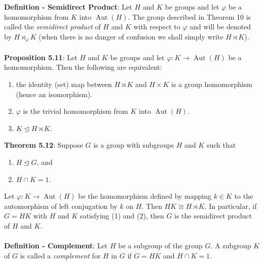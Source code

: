 \documentclass{article}
\DeclareMathOperator{\aut}{Aut}
\begin{document}
\textbf{Definition - Semidirect Product}: Let $H$ and $K$ be groups and let $\varphi$ be a homomorphism from $K$ into $\aut(H)$. The group described in Theorem 10 is called the \textit{semidirect product} of $H$ and $K$ with respect to $\varphi$ and will be denoted by $H \rtimes_\varphi K$ (when there is no danger of confusion we shall simply write $H \rtimes K$). \\ \\
\textbf{Proposition 5.11}: Let $H$ and $K$ be groups and let $\varphi: K \rightarrow \aut(H)$ be a homomorphism. Then the following are equivalent: \begin{enumerate}
    \item the identity (set) map between $H \rtimes K$ and $H \times K$ is a group homomorphism (hence an isomorphism).
    \item $\varphi$ is the trivial homomorphism from $K$ into $\aut(H)$.
    \item $K \trianglelefteq H \rtimes K$. 
\end{enumerate} $ $ \\
\textbf{Theorem 5.12}: Suppose $G$ is a group with subgroups $H$ and $K$ such that \begin{enumerate}
    \item $H \trianglelefteq G$, and
    \item $H \cap K = 1$. 
\end{enumerate} Let $\varphi: K \rightarrow \aut(H)$ be the homomorphism defined by mapping $k \in K$ to the automorphism of left conjugation by $k$ on $H$. Then $HK \cong H \rtimes K$. In particular, if $G = HK$ with $H$ and $K$ satisfying (1) and (2), then $G$ is the semidirect product of $H$ and $K$. \\ \\
\textbf{Definition - Complement}: Let $H$ be a subgroup of the group $G$. A subgroup $K$ of $G$ is called a \textit{complement} for $H$ in $G$ if $G = H K$ and $H \cap K = 1$.
\end{document}
